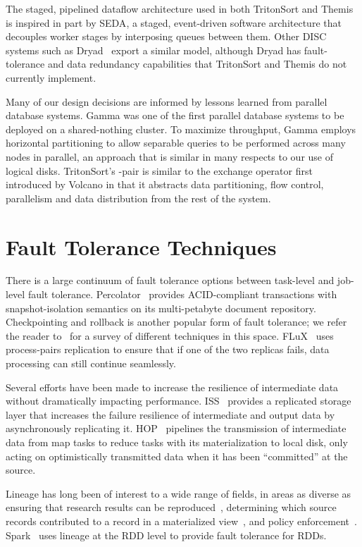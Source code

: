 The staged, pipelined dataflow architecture used in both TritonSort and Themis
is inspired in part by SEDA\cite{seda}, a staged, event-driven software
architecture that decouples worker stages by interposing queues between them.
Other DISC systems such as Dryad~\cite{dryad} export a similar model, although
Dryad has fault-tolerance and data redundancy capabilities that TritonSort and
Themis do not currently implement.

Many of our design decisions are informed by lessons learned from parallel
database systems.  Gamma\cite{gamma} was one of the first parallel database
systems to be deployed on a shared-nothing cluster.  To maximize throughput,
Gamma employs horizontal partitioning to allow separable queries to be
performed across many nodes in parallel, an approach that is similar in many
respects to our use of logical disks.  TritonSort's \sender-\receiver pair is
similar to the exchange operator first introduced by Volcano\cite{volcano} in
that it abstracts data partitioning, flow control, parallelism and data
distribution from the rest of the system.

\section{Fault Tolerance Techniques}

There is a large continuum of fault tolerance options between task-level and
job-level fault tolerance.  Percolator~\cite{percolator} provides
ACID-compliant transactions with snapshot-isolation semantics on its
multi-petabyte document repository. Checkpointing and rollback is another
popular form of fault tolerance; we refer the reader
to~\cite{Elnozahy:2002:SRP:568522.568525} for a survey of different techniques
in this space.  FLuX~\cite{flux} uses process-pairs replication to ensure that
if one of the two replicas fails, data processing can still continue seamlessly.

Several efforts have been made to increase the resilience of intermediate data
without dramatically impacting performance. ISS~\cite{ko-intermediate} provides
a replicated storage layer that increases the failure resilience of
intermediate and output data by asynchronously replicating it.  HOP~\cite{hop}
pipelines the transmission of intermediate data from map tasks to reduce tasks
with its materialization to local disk, only acting on optimistically
transmitted data when it has been ``committed'' at the source.

Lineage has long been of interest to a
wide range of fields, in areas as diverse as ensuring that research results can
be reproduced~\cite{Bose05lineageretrieval}, determining which source records
contributed to a record in a materialized view~\cite{cui_lineage}, and policy
enforcement~\cite{Xu06taint-enhancedpolicy}. Spark~\cite{spark} uses lineage at
the RDD level to provide fault tolerance for RDDs.

